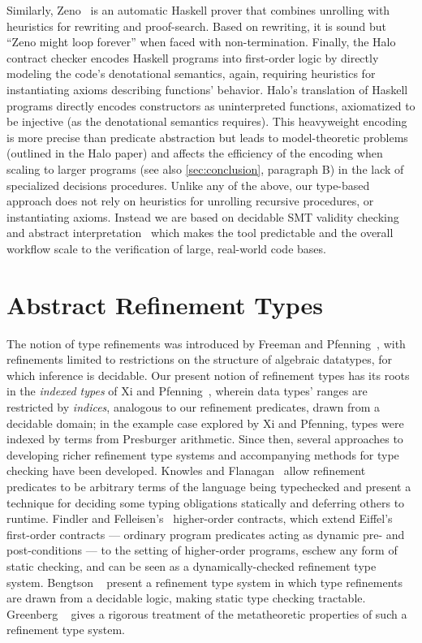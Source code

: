 %
Similarly, Zeno~\cite{ZENO} is an automatic Haskell 
prover that combines unrolling with heuristics for rewriting
and proof-search. 
Based on rewriting, it is sound but 
``Zeno might loop forever'' when faced with 
non-termination.
%
Finally, the Halo~\cite{halo} contract checker encodes 
Haskell programs into first-order logic by directly 
modeling the code's denotational semantics,
again, requiring heuristics for instantiating axioms 
describing functions' behavior. Halo's translation of Haskell
programs directly encodes constructors as uninterpreted functions,
axiomatized to be injective (as the denotational semantics requires).
This heavyweight encoding is more precise than predicate abstraction 
but leads to model-theoretic problems (outlined in the Halo paper) and 
affects the efficiency of the encoding when scaling to larger programs 
(see also \ref{sec:conclusion}, paragraph B) in the lack of specialized 
decisions procedures.
%
Unlike any of the above, our type-based approach does 
not rely on heuristics for unrolling recursive procedures, 
or instantiating axioms. 
%
Instead we are based on decidable SMT validity 
checking and abstract interpretation~\cite{LiquidPLDI08} 
which makes the tool predictable and the overall workflow
scale to the verification of large, real-world
code bases.

\section{Abstract Refinement Types}\label{sec:related}

The notion of type refinements was introduced by Freeman and
Pfenning~\cite{FreemanPfenning91}, with refinements limited to
restrictions on the structure of algebraic datatypes, for which
inference is decidable.
%
Our present notion of refinement types has its roots in the
\emph{indexed types} of Xi and Pfenning~\cite{pfenningxi98}, wherein
data types' ranges are restricted by \emph{indices}, analogous to our
refinement predicates, drawn from a decidable domain; in the example
case explored by Xi and Pfenning, types were indexed by terms from
Presburger arithmetic.
%
Since then, several approaches to developing richer refinement type
systems and accompanying methods for type checking have been
developed.
%
Knowles and Flanagan~\cite{Knowles10} allow refinement predicates to
be arbitrary terms of the language being typechecked and present a
technique for deciding some typing obligations statically and
deferring others to runtime.
%
Findler and Felleisen's~\cite{Findler02} higher-order contracts, which
extend Eiffel's~\cite{MeyerBook} first-order contracts --- ordinary
program predicates acting as dynamic pre- and post-conditions --- to
the setting of higher-order programs, eschew any form of static
checking, and can be seen as a dynamically-checked refinement type
system.
%
Bengtson \etal~\cite{GordonTOPLAS2011} present a refinement type
system in which type refinements are drawn from a decidable logic,
making static type checking tractable.
%
Greenberg \etal~\cite{Greenberg11} gives a rigorous treatment of the
metatheoretic properties of such a refinement type system.

